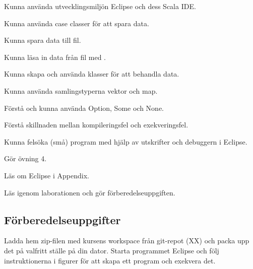 


\Lab{\LabWeekFOUR}

\begin{Goals}
\item Kunna använda utvecklingsmiljön Eclipse och dess Scala IDE.
\item Kunna använda case classer för att spara data.
\item Kunna spara data till fil.
\item Kunna l{\"a}sa in data fr{\aa}n fil med .
\item Kunna skapa och använda klasser för att behandla data.
\item Kunna använda samlingstyperna vektor och map.
\item Förstå och kunna använda Option, Some och None. 
\item Förstå skillnaden mellan kompileringsfel och exekveringsfel.
\item Kunna felsöka (små) program med hjälp av utskrifter och debuggern i Eclipse.

\end{Goals}

\begin{Preparations}
\item G{\"o}r {\"o}vning 4. %
\item Läs om Eclipse i Appendix.
\item Läs igenom laborationen och gör förberedelseuppgiften.
\end{Preparations}


\subsection{Förberedelseuppgifter}
\Task Ladda hem zip-filen med kursens workspace från git-repot (XX) och packa upp det på valfritt ställe på din dator. Starta programmet Eclipse och följ instruktionerna i figurer för att skapa ett program och exekvera det.

